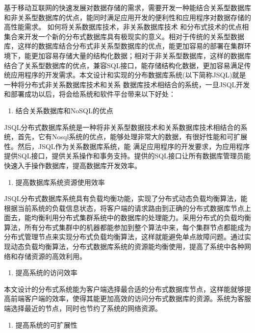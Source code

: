 基于移动互联网的快速发展对数据存储的需求，需要开发一种能结合关系型数据库和非关系型数据库的优点，能同时满足应用开发的便利性和应用程序对数据存储的高性能需求。
如何将关系数据库技术，非关系数据库技术
和分布式技术的优点相集合来开发一个新的分布式数据库具有极现实的意义。相对于传统的关系型数据库，这样的数据库结合分布式非关系型数据库的优点，能更加容易的部署在集群环境下，能更加容易存储大量的结构化数据；相对于非关系型数据库，这样的数据库结合了关系型数据库的优点，兼容SQL接口，能存储结构化数据，更加容易满足传统应用程序的开发需求。本文设计和实现的分布数据库系统(以下简称JSQL)就是一种将分布式非关系数据库技术和关系
数据库技术相结合的系统，一旦JSQL开发和部署成功以后，将会给系统和软件平台带来以下好处：

\begin{enumerate}
	\item 结合关系数据库和NoSQL的优点
\end{enumerate}

	JSQL分布式数据库系统是一种将非关系型数据技术和关系数据库技术相结合的系统，首先，它有Nosql系统的优点，能够处理非常大的数据，有很好性能和可扩展性。然后，JSQL作为关系数据库系统，能
	满足应用程序的开发要求，为应用程序提供SQL接口，提供关系操作和事务支持。提供的SQL接口让所有数据库管理员能快速入手操作数据库，提高数据库开发效率。
	
	\begin{enumerate}[resume]
		\item 提高数据库系统资源使用效率
	\end{enumerate}

	JSQL分布式数据库系统具有负载均衡功能，实现了分布式动态负载均衡算法，能根据当前系统的负载信息状态，将客户端的请求路由到正确的分布式数据库节点上面去，能均衡利用分布式集群系统中的数据库的处理能力。采用分布式的负载均衡算法，所有分布式集群中的机器都能参加到整个算法中来，每个集群节点都能成为分布式管理节点来实现分布式负载均衡算法，这样就能避免单点故障问题。通过实现动态负载均衡算法，分布式数据库系统的资源能均衡使用，提高了系统中各种网络和存储资源的高效利用。
	
	\begin{enumerate}[resume]
		\item 提高系统的访问效率
	\end{enumerate}

	本文设计的分布式系统能为客户端选择最合适的分布式数据库节点，这样能就够提高前端客户端的效率，使得其能更加高效的访问分布式数据库的资源。系统为客服端选择最近的节点，同时也节约了系统的网络资源。
	
	\begin{enumerate}[resume]
		\item 提高系统的可扩展性
	\end{enumerate}

